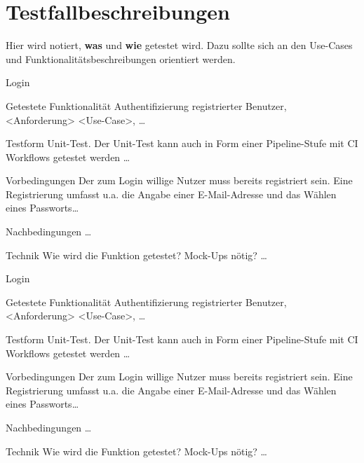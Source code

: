 \chapter{Testfallbeschreibungen}
\label{chap:test}

Hier wird notiert, \textbf{was} und \textbf{wie} getestet wird. Dazu sollte sich an den Use-Cases und Funktionalitätsbeschreibungen orientiert werden.

\begin{testcase}{10}{Login}
  \item[Getestete Funktionalität] Authentifizierung registrierter Benutzer, <Anforderung> <Use-Case>, \ldots
  \item[Testform] Unit-Test. Der Unit-Test kann auch in Form einer Pipeline-Stufe mit \gls{CI} Workflows getestet werden \ldots
  \item[Vorbedingungen] Der zum Login willige Nutzer muss bereits registriert sein. Eine Registrierung umfasst u.a. die Angabe einer E-Mail-Adresse und das Wählen eines Passworts\ldots
  \item[Nachbedingungen] \ldots
  \item[Technik] Wie wird die Funktion getestet? Mock-Ups nötig? \ldots
\end{testcase}

\begin{testcase}{10}{Login}
  \item[Getestete Funktionalität] Authentifizierung registrierter Benutzer, <Anforderung> <Use-Case>, \ldots
  \item[Testform] Unit-Test. Der Unit-Test kann auch in Form einer Pipeline-Stufe mit \gls{CI} Workflows getestet werden \ldots
  \item[Vorbedingungen] Der zum Login willige Nutzer muss bereits registriert sein. Eine Registrierung umfasst u.a. die Angabe einer E-Mail-Adresse und das Wählen eines Passworts\ldots
  \item[Nachbedingungen] \ldots
  \item[Technik] Wie wird die Funktion getestet? Mock-Ups nötig? \ldots
\end{testcase}
